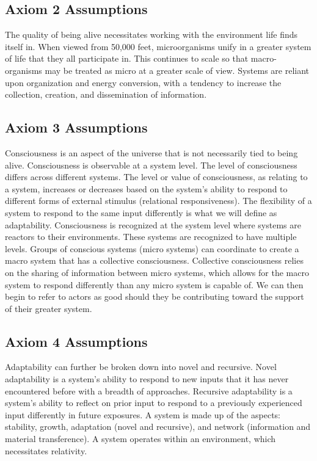 \documentclass[11pt]{article}
\begin{document}
\subsection*{Axiom 2 Assumptions}
The quality of being alive necessitates working with the environment life finds itself in.
When viewed from 50,000 feet, microorganisms unify in a greater system of life that they all participate in.
This continues to scale so that macro-organisms may be treated as micro at a greater scale of view.
Systems are reliant upon organization and energy conversion, with a tendency to increase the collection, creation, and dissemination of information.

\subsection*{Axiom 3 Assumptions}
Consciousness is an aspect of the universe that is not necessarily tied to being alive. 
Consciousness is observable at a system level. 
The level of consciousness differs across different systems.
The level or value of consciousness, as relating to a system, increases or decreases based on the system’s ability to respond to different forms of external stimulus (relational responsiveness).
The flexibility of a system to respond to the same input differently is what we will define as adaptability. 
Consciousness is recognized at the system level where systems are reactors to their environments. These systems are recognized to have multiple levels.
Groups of conscious systems (micro systems) can coordinate to create a macro system that has a collective consciousness.
Collective consciousness relies on the sharing of information between micro systems, which allows for the macro system to respond differently than any micro system is capable of.
We can then begin to refer to actors as good should they be contributing toward the support of their greater system.

\subsection*{Axiom 4 Assumptions}
Adaptability can further be broken down into novel and recursive. 
Novel adaptability is a system’s ability to respond to new inputs that it has never encountered before with a breadth of approaches. 
Recursive adaptability is a system’s ability to reflect on prior input to respond to a previously experienced input differently in future exposures.
A system is made up of the aspects: stability, growth, adaptation (novel and recursive), and network (information and material transference).
A system operates within an environment, which necessitates relativity.
\end{document}
